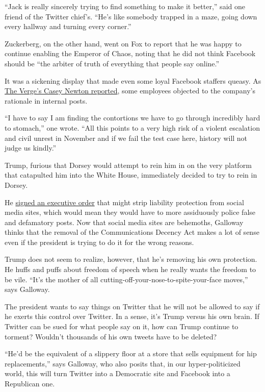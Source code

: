 ``Jack is really sincerely trying to find something to make it better,''
said one friend of the Twitter chief's. ``He's like somebody trapped in
a maze, going down every hallway and turning every corner.''

Zuckerberg, on the other hand, went on Fox to report that he was happy
to continue enabling the Emperor of Chaos, noting that he did not think
Facebook should be ``the arbiter of truth of everything that people say
online.''

It was a sickening display that made even some loyal Facebook staffers
queasy. As
\href{https://www.theverge.com/2020/5/29/21275044/facebook-trump-tweets-employee-reaction-criticism}{The
Verge's Casey Newton reported}, some employees objected to the company's
rationale in internal posts.

``I have to say I am finding the contortions we have to go through
incredibly hard to stomach,'' one wrote. ``All this points to a very
high risk of a violent escalation and civil unrest in November and if we
fail the test case here, history will not judge us kindly.''

Trump, furious that Dorsey would attempt to rein him in on the very
platform that catapulted him into the White House, immediately decided
to try to rein in Dorsey.

He
\href{https://www.nytimes3xbfgragh.onion/2020/05/28/us/politics/trump-order-social-media.html}{signed
an executive order} that might strip liability protection from social
media sites, which would mean they would have to more assiduously police
false and defamatory posts. Now that social media sites are behemoths,
Galloway thinks that the removal of the Communications Decency Act makes
a lot of sense even if the president is trying to do it for the wrong
reasons.

Trump does not seem to realize, however, that he's removing his own
protection. He huffs and puffs about freedom of speech when he really
wants the freedom to be vile. ``It's the mother of all
cutting-off-your-nose-to-spite-your-face moves,'' says Galloway.

The president wants to say things on Twitter that he will not be allowed
to say if he exerts this control over Twitter. In a sense, it's Trump
versus his own brain. If Twitter can be sued for what people say on it,
how can Trump continue to torment? Wouldn't thousands of his own tweets
have to be deleted?

``He'd be the equivalent of a slippery floor at a store that sells
equipment for hip replacements,'' says Galloway, who also posits that,
in our hyper-politicized world, this will turn Twitter into a Democratic
site and Facebook into a Republican one.

